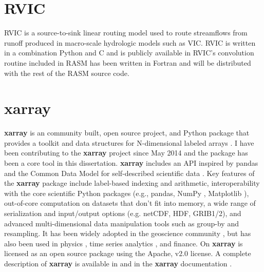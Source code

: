 
\section{RVIC}
\label{sec:rvic_dev}

RVIC is a source-to-sink linear routing model used to route streamflows from runoff produced in macro-scale hydrologic models such as VIC.
RVIC is written in a combination Python and C and is publicly available in \citet{Hamman_2015}
RVIC's convolution routine included in RASM has been written in Fortran and will be distributed with the rest of the RASM source code.

\section{xarray}
\label{sec:xarray_dev}

\textbf{xarray} is an community built, open source project, and Python package that provides a toolkit and data structures for N-dimensional labeled arrays \citep{Hoyer_2016}.
I have been contributing to the \textbf{xarray} project since May 2014 and the package has been a core tool in this dissertation.
\textbf{xarray} includes an API inspired by pandas \citep{mckinney_2010} and the Common Data Model for self-described scientific data \citep{Rew_1990,Brown_1993}.
Key features of the \textbf{xarray} package include label-based indexing and arithmetic, interoperability with the core scientific Python packages (e.g., pandas, NumPy \citep{Jones_2001}, Matplotlib \citep{van_der_Walt_2011}), out-of-core computation on datasets that don't fit into memory, a wide range of serialization and input/output options (e.g. netCDF, HDF, GRIB1/2), and advanced multi-dimensional data manipulation tools such as group-by and resampling.
It has been widely adopted in the geoscience community \citep[e.g.][]{xgcm,Dawson_2016a,Dawson_2016b}, but has also been used in physics \citep[e.g.][]{pycalphad}, time series analytics \citep{cesium}, and finance.
On
\textbf{xarray} is licensed as an open
source package using the Apache, v2.0 license.
A complete description of \textbf{xarray} is available in \citet{Hoyer_2016} and in the \textbf{xarray} documentation \citep{xarray_docs}.
